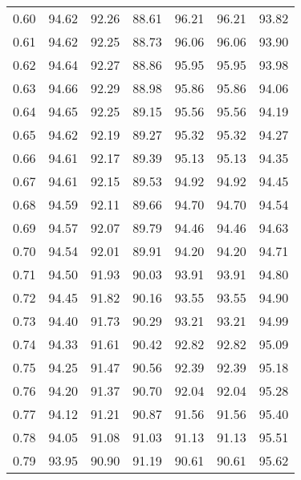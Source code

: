 \begin{tabular}{|c|c|c|c|c|c|c|}
      0.60 &     94.62 &     92.26 &      88.61 &   96.21 &      96.21 &         93.82 \\
      0.61 &     94.62 &     92.25 &      88.73 &   96.06 &      96.06 &         93.90 \\
      0.62 &     94.64 &     92.27 &      88.86 &   95.95 &      95.95 &         93.98 \\
      0.63 &     94.66 &     92.29 &      88.98 &   95.86 &      95.86 &         94.06 \\
      0.64 &     94.65 &     92.25 &      89.15 &   95.56 &      95.56 &         94.19 \\
      0.65 &     94.62 &     92.19 &      89.27 &   95.32 &      95.32 &         94.27 \\
      0.66 &     94.61 &     92.17 &      89.39 &   95.13 &      95.13 &         94.35 \\
      0.67 &     94.61 &     92.15 &      89.53 &   94.92 &      94.92 &         94.45 \\
      0.68 &     94.59 &     92.11 &      89.66 &   94.70 &      94.70 &         94.54 \\
      0.69 &     94.57 &     92.07 &      89.79 &   94.46 &      94.46 &         94.63 \\
      0.70 &     94.54 &     92.01 &      89.91 &   94.20 &      94.20 &         94.71 \\
      0.71 &     94.50 &     91.93 &      90.03 &   93.91 &      93.91 &         94.80 \\
      0.72 &     94.45 &     91.82 &      90.16 &   93.55 &      93.55 &         94.90 \\
      0.73 &     94.40 &     91.73 &      90.29 &   93.21 &      93.21 &         94.99 \\
      0.74 &     94.33 &     91.61 &      90.42 &   92.82 &      92.82 &         95.09 \\
      0.75 &     94.25 &     91.47 &      90.56 &   92.39 &      92.39 &         95.18 \\
      0.76 &     94.20 &     91.37 &      90.70 &   92.04 &      92.04 &         95.28 \\
      0.77 &     94.12 &     91.21 &      90.87 &   91.56 &      91.56 &         95.40 \\
      0.78 &     94.05 &     91.08 &      91.03 &   91.13 &      91.13 &         95.51 \\
      0.79 &     93.95 &     90.90 &      91.19 &   90.61 &      90.61 &         95.62 \\

\end{tabular}
